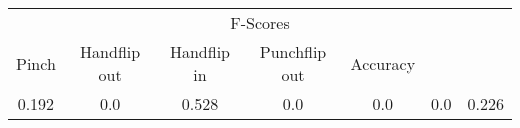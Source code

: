 \documentclass{standalone}
\begin{document}
 
 \begin{tabular}{|c|c|c|c|c|c ||c|}
\cline{1-7}\multicolumn{7}{|c|}{F-Scores} \\ 
\cline{1-7}Pinch & Handflip out & Handflip in & Punchflip out & Accuracy\\ 
\cline{1-7}0.192 & 0.0 & 0.528 & 0.0 & 0.0 & 0.0 & 0.226\\ 
 \cline{1-7}\hline \end{tabular}
 
\end{document}
